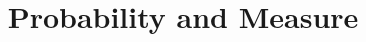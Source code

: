 \documentclass[a4paper]{article}
\begin{document}
\title{Probability and Measure}

\maketitle

\newpage

\tableofcontents

\newpage
\end{document}
